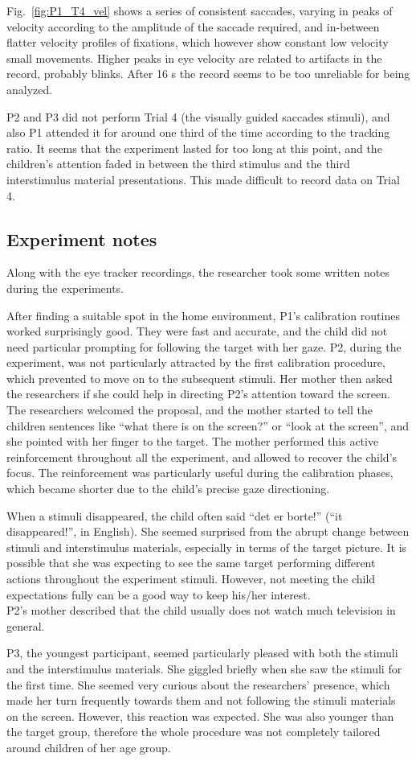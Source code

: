 Fig.~\ref{fig:P1_T4_vel} shows a series of consistent saccades, varying in peaks of velocity according to the amplitude of the saccade required, and in-between flatter velocity profiles of fixations, which however show constant low velocity small movements. Higher peaks in eye velocity are related to artifacts in the record, probably blinks. After 16 s the record seems to be too unreliable for being analyzed.

P2 and P3 did not perform Trial 4 (the visually guided saccades stimuli), and also P1 attended it for around one third of the time according to the tracking ratio. It seems that the experiment lasted for too long at this point, and the children’s attention faded in between the third stimulus and the third interstimulus material presentations. This made difficult to record data on Trial 4.

\subsection{Experiment notes}
\label{sec:expnotes}

Along with the eye tracker recordings, the researcher took some written notes during the experiments.

After finding a suitable spot in the home environment, P1’s calibration routines worked surprisingly good. They were fast and accurate, and the child did not need particular prompting for following the target with her gaze.
P2, during the experiment, was not particularly attracted by the first calibration procedure, which prevented to move on to the subsequent stimuli. Her mother then asked the researchers if she could help in directing P2’s attention toward the screen. The researchers welcomed the proposal, and the mother started to tell the children sentences like “what there is on the screen?” or “look at the screen”, and she pointed with her finger to the target. The mother performed this active reinforcement throughout all the experiment, and allowed to recover the child’s focus. The reinforcement was particularly useful during the calibration phases, which became shorter due to the child’s precise gaze directioning.

When a stimuli disappeared, the child often said “det er borte!” (“it disappeared!”, in English). She seemed surprised from the abrupt change between stimuli and interstimulus materials, especially in terms of the target picture. It is possible that she was expecting to see the same target performing different actions throughout the experiment stimuli. However, not meeting the child expectations fully can be a good way to keep his/her interest.\\
P2’s mother described that the child usually does not watch much television in general.

P3, the youngest participant, seemed particularly pleased with both the stimuli and the interstimulus materials. She giggled briefly when she saw the stimuli for the first time. She seemed very curious about the researchers’ presence, which made her turn frequently towards them and not following the stimuli materials on the screen. However, this reaction was expected. She was also younger than the target group, therefore the whole procedure was not completely tailored around children of her age group.